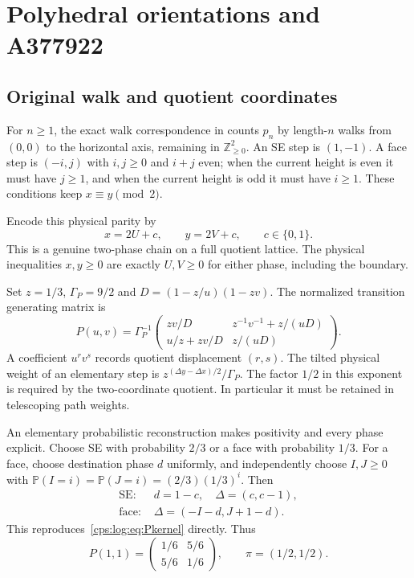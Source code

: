 \documentclass[11pt,letterpaper]{article}
\numberwithin{equation}{section}
\theoremstyle{remark}\newtheorem{remark}[theorem]{Remark}
\newcommand{\PP}{\mathbb P}
\newcommand{\ZZ}{\mathbb Z}
\newcommand{\gp}{\Gamma_P}\newcommand{\gs}{\Gamma_S}
\begin{document}
\section{Polyhedral orientations and A377922}\label{cps:log:sec:corner}
\subsection{Original walk and quotient coordinates}
For $n\ge1$, the exact walk correspondence in \cite[Proposition 13]{FNS} counts $p_n$
by length-$n$ walks from $(0,0)$ to the horizontal axis, remaining in
$\ZZ_{\ge0}^2$. An SE step is $(1,-1)$. A face step is $(-i,j)$ with
$i,j\ge0$ and $i+j$ even; when the current height is even it must have
$j\ge1$, and when the current height is odd it must have $i\ge1$.
These conditions keep $x\equiv y\pmod2$.

Encode this physical parity by
\begin{equation}\label{cps:log:eq:cornerquot}
 x=2U+c,\qquad y=2V+c,\qquad c\in\{0,1\}.
\end{equation}
This is a genuine two-phase chain on a full quotient lattice. The
physical inequalities $x,y\ge0$ are exactly $U,V\ge0$ for either
phase, including the boundary.

Set $z=1/3$, $\gp=9/2$ and $D=(1-z/u)(1-zv)$. The normalized transition
generating matrix is
\begin{equation}\label{cps:log:eq:Pkernel}
 P(u,v)=\gp^{-1}
 \begin{pmatrix}
 zv/D&z^{-1}v^{-1}+z/(uD)\\
 u/z+zv/D&z/(uD)
 \end{pmatrix}.
\end{equation}
A coefficient $u^rv^s$ records quotient displacement $(r,s)$.
The tilted physical weight of an elementary step is
$z^{(\Delta y-\Delta x)/2}/\gp$.
The factor $1/2$ in this exponent is required by the two-coordinate
quotient. In particular it must be retained in telescoping path weights.

An elementary probabilistic reconstruction makes positivity and every
phase explicit. Choose SE with probability $2/3$ or a face with
probability $1/3$. For a face, choose destination phase $d$ uniformly,
and independently choose $I,J\ge0$ with
$\PP(I=i)=\PP(J=i)=(2/3)(1/3)^i$. Then
\begin{align*}
 \text{SE: }&d=1-c,\quad\Delta=(c,c-1),\\
 \text{face: }&\Delta=(-I-d,J+1-d).
\end{align*}
This reproduces~\eqref{cps:log:eq:Pkernel} directly. Thus
\[
 P(1,1)=\begin{pmatrix}1/6&5/6\\5/6&1/6\end{pmatrix},\qquad
 \pi=(1/2,1/2).
\]
\end{document}
